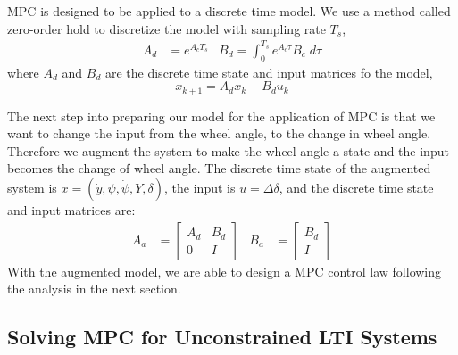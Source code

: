 \documentclass{article}
\begin{document}
MPC is designed to be applied to a discrete time model. We use a method called zero-order hold to discretize the model
with sampling rate $T_s$,
\begin{align}
    A_d &= e^{A_cT_s} & B_d = \int_0^{T_s}e^{A_c\tau}B_c\;d\tau
\end{align}
where $A_d$ and $B_d$ are the discrete time state and input matrices fo the model,
\begin{equation}
    x_{k+1} = A_dx_k + B_du_k
\end{equation}

The next step into preparing our model for the application of MPC is that we want to change the input from the wheel
angle, to the change in wheel angle. Therefore we augment the system to make the wheel angle
a state and the input becomes the change of wheel angle. The discrete time state of the augmented system is $x =
(\dot{y}, \psi, \dot{\psi}, Y, \delta)$, the input is $u = \Delta\delta$, and the discrete time state and input
matrices are:
\begin{align}
    A_a &= \begin{bmatrix}
        A_d & B_d \\
        0 & I
    \end{bmatrix} &
    B_a &= \begin{bmatrix}
        B_d \\ I
    \end{bmatrix}
\end{align}
With the augmented model, we are able to design a MPC control law following the analysis in the next section.

\subsection{Solving MPC for Unconstrained LTI Systems}
\end{document}
